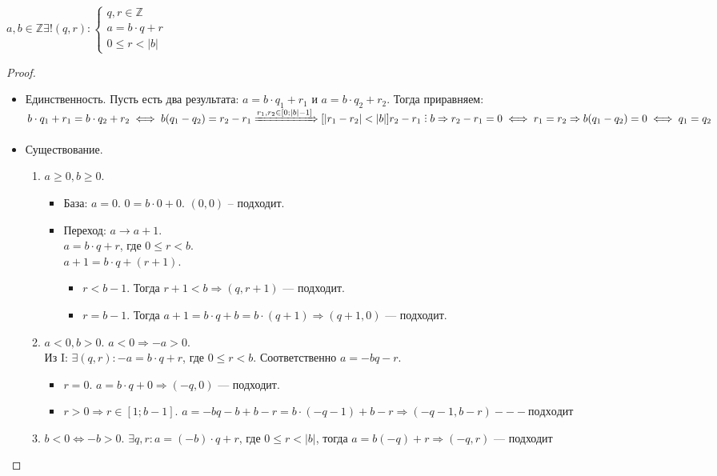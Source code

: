 \begin{theorem}
    $a, b \in \mathbb{Z} \exists ! (q,r): \left\{ \begin{array}{l} q, r \in \mathbb{Z} \\ a = b \cdot q + r \\ 0 \le r < |b| \end{array} \right.$
\end{theorem}
\begin{proof}
    \begin{itemize}
        \item 
        Единственность. Пусть есть два результата: $a = b \cdot q_1 + r_1$ и $a = b \cdot q_2 + r_2$. Тогда приравняем: $b \cdot q_1 + r_1 = b \cdot q_2 + r_2 \iff b(q_1 - q_2) = r_2 - r_1 \xRightarrow{r_1, r_2 \in \left[0;|b|-1\right]}[|r_1-r_2| < |b|] r_2-r_1 \divby b \Rightarrow r_2-r_1=0 \iff r_1=r_2 \Rightarrow b(q_1-q_2)=0 \iff q_1=q_2$ 
    \item Существование. 
        \begin{enumerate}[label=\Roman*.,ref=\arabic*]
            \item $a \ge 0, b \ge 0$. 
            \begin{itemize}
            \item    
                База: $a = 0$. $0 = b \cdot 0 + 0$.  $(0, 0)$ -- подходит.
            \item
                Переход:  $a \to a + 1$.\\
                $a = b \cdot q + r$, где  $0 \le r < b$.\\
                $a + 1 = b \cdot q + (r + 1)$.
                \begin{itemize}
                    \item $r < b - 1$. Тогда  $r + 1 < b \Rightarrow \left(q, r+1\right)$ --- подходит.
                    \item  $r = b - 1$. Тогда $a + 1 = b \cdot q + b = b \cdot (q + 1) \Rightarrow (q + 1, 0)$ --- подходит.
                \end{itemize}
            \end{itemize}
        \item  $a  < 0, b > 0$. $a < 0 \Rightarrow -a > 0$. \\
            Из I:  $\exists (q, r): -a = b \cdot q + r$, где $0 \le r < b$. Соответственно $a = -bq - r$.
            \begin{itemize}
                \item $r = 0$.  $a = b \cdot q + 0 \Rightarrow (-q, 0)$ --- подходит.
                \item  $r > 0 \Rightarrow r \in \left[1; b - 1\right]$.  $a = -bq -b + b -r = b \cdot (-q -1) + b - r \Rightarrow \left( -q -1, b-r\right) --- подходит$
            \end{itemize}
        \item $b < 0 \iff -b > 0$.  $\exists q, r: a = (-b) \cdot q + r$, где  $0 \le r < |b|$, тогда $a = b(-q) +r \Rightarrow (-q, r)\text{ --- подходит}$
        \end{enumerate}
    \end{itemize}
\end{proof}

